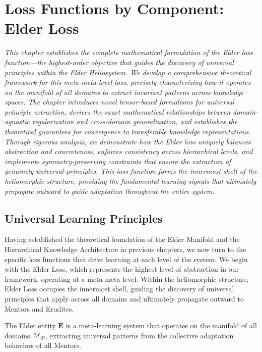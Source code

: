 \chapter{Loss Functions by Component: Elder Loss}

\textit{This chapter establishes the complete mathematical formulation of the Elder loss function—the highest-order objective that guides the discovery of universal principles within the Elder Heliosystem. We develop a comprehensive theoretical framework for this meta-meta-level loss, precisely characterizing how it operates on the manifold of all domains to extract invariant patterns across knowledge spaces. The chapter introduces novel tensor-based formalisms for universal principle extraction, derives the exact mathematical relationships between domain-agnostic regularization and cross-domain generalization, and establishes the theoretical guarantees for convergence to transferable knowledge representations. Through rigorous analysis, we demonstrate how the Elder loss uniquely balances abstraction and concreteness, enforces consistency across hierarchical levels, and implements symmetry-preserving constraints that ensure the extraction of genuinely universal principles. This loss function forms the innermost shell of the heliomorphic structure, providing the fundamental learning signals that ultimately propagate outward to guide adaptation throughout the entire system.}

\section{Universal Learning Principles}

Having established the theoretical foundation of the Elder Manifold and the Hierarchical Knowledge Architecture in previous chapters, we now turn to the specific loss functions that drive learning at each level of the system. We begin with the Elder Loss, which represents the highest level of abstraction in our framework, operating at a meta-meta level. Within the heliomorphic structure, Elder Loss occupies the innermost shell, guiding the discovery of universal principles that apply across all domains and ultimately propagate outward to Mentors and Erudites.

\begin{definition}
The Elder entity $\textbf{E}$ is a meta-learning system that operates on the manifold of all domains $\mathcal{M}_{\mathcal{D}}$, extracting universal patterns from the collective adaptation behaviors of all Mentors.
\end{definition}

